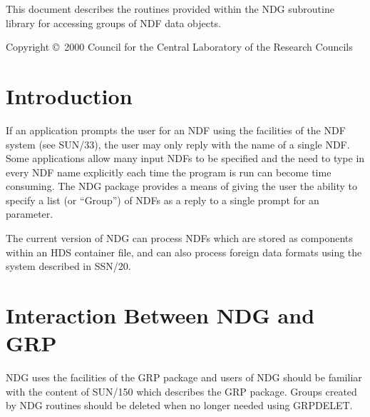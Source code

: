 \documentclass[twoside,11pt]{article}
\newcommand{\stardocinitials}  {SUN}
\newcommand{\stardoccopyright} 
{Copyright \copyright\ 2000 Council for the Central Laboratory of the Research Councils}
\newcommand{\stardocnumber}    {2.8}
\newcommand{\stardocabstract}  {
This document describes the routines provided within the NDG subroutine 
library for accessing groups of NDF data objects. 
}
\newcommand{\stardocname}{\stardocinitials /\stardocnumber}
\newenvironment{latexonly}{}{}
\newcommand{\xref}[3]{#1}
\renewcommand{\_}{\texttt{\symbol{95}}}
\renewcommand{\thepage}{\roman{page}}
\begin{document}
\stardocabstract

\begin{latexonly}
\newpage
\vspace*{\fill}
\stardoccopyright
\end{latexonly}

  \newpage
  \begin{latexonly}
    \setlength{\parskip}{0mm}
    \tableofcontents
    \setlength{\parskip}{\medskipamount}
    \markboth{\stardocname}{\stardocname}
  \end{latexonly}

\cleardoublepage
\renewcommand{\thepage}{\arabic{page}}
\setcounter{page}{1}

\section {Introduction}

If an application prompts the user for an NDF using the facilities of the NDF\_ 
system (see \xref{SUN/33}{sun33}{}), the user may only reply with the name of a single NDF. Some
applications allow many input NDFs to be specified and the need to
type in every NDF name explicitly each time the program is run can become time
consuming. The NDG package provides a means of giving the user the
ability to specify a list (or ``Group'') of NDFs as a reply to a single prompt
for an parameter. 

The current version of NDG can process NDFs which are stored as
components within an HDS container file, and can also process foreign
data formats using the system described in \xref{SSN/20}{ssn20}{}.


\section {Interaction Between NDG and GRP}
NDG uses the facilities of the GRP package and users of NDG should be familiar
with the content of \xref{SUN/150}{sun150}{} which describes the GRP package. Groups
created by NDG routines should be deleted when no longer needed using
\xref{GRP\_DELET}{sun150}{GRP\_DELET}.
\end{document}
